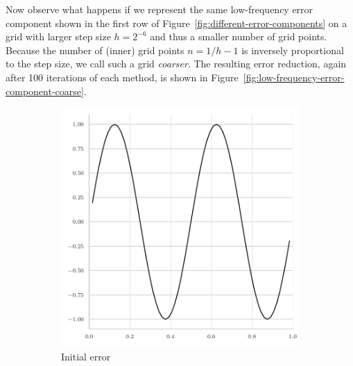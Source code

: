 Now observe what happens if we represent the same low-frequency error component shown in the first row of Figure~\ref{fig:different-error-components} on a grid with larger step size $h = 2^{-6}$ and thus a smaller number of grid points.
Because the number of (inner) grid points $n = 1/h - 1$ is inversely proportional to the step size, we call such a grid \emph{coarser}.
The resulting error reduction, again after 100 iterations of each method, is shown in Figure~\ref{fig:low-frequency-error-component-coarse}. 
\begin{figure}
	\begin{subfigure}[t]{0.32\textwidth}
	\centering
	\includegraphics[width=\textwidth]{figures/error_plots//initial_error_jacobi_4pi_coarse.pdf}
	\caption{Initial error}
\end{subfigure}
\hfill
\begin{subfigure}[t]{0.32\textwidth}
	\centering

\end{subfigure}
\end{figure}
